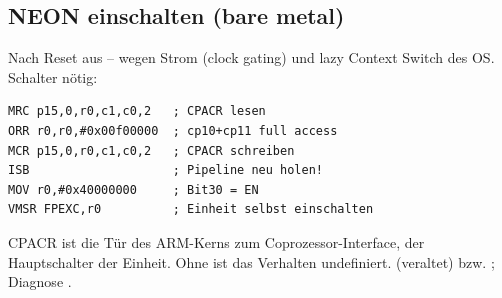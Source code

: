 \subsection{NEON einschalten (bare metal)}
Nach Reset aus -- wegen Strom (clock gating) und lazy Context Switch des OS.
 Schalter nötig:
\begin{lstlisting}
MRC p15,0,r0,c1,c0,2   ; CPACR lesen
ORR r0,r0,#0x00f00000  ; cp10+cp11 full access
MCR p15,0,r0,c1,c0,2   ; CPACR schreiben
ISB                    ; Pipeline neu holen!
MOV r0,#0x40000000     ; Bit30 = EN
VMSR FPEXC,r0          ; Einheit selbst einschalten
\end{lstlisting}
CPACR ist die Tür des ARM-Kerns zum Coprozessor-Interface,
 der Hauptschalter der Einheit. Ohne  ist das
Verhalten undefiniert.
  (veraltet) bzw.
; Diagnose .

